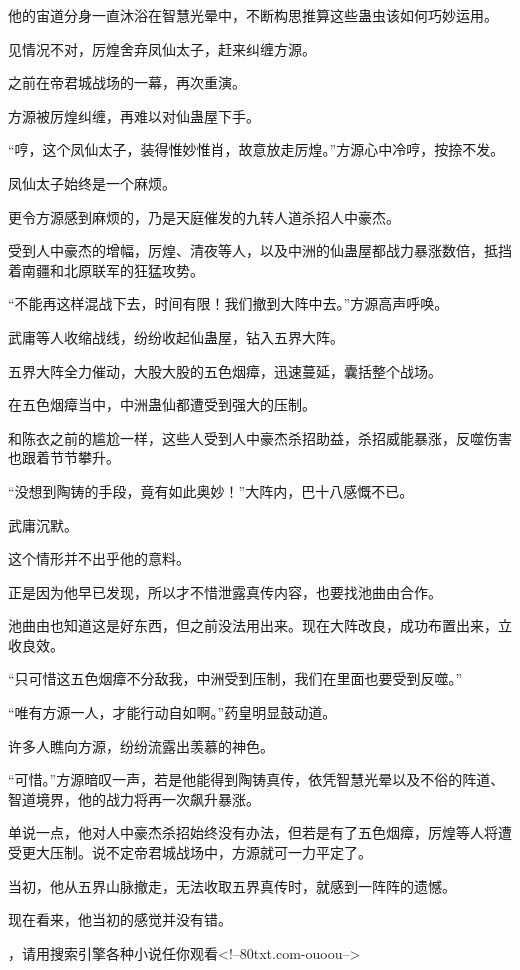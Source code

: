 \begin{this_body}
他的宙道分身一直沐浴在智慧光晕中，不断构思推算这些蛊虫该如何巧妙运用。

见情况不对，厉煌舍弃凤仙太子，赶来纠缠方源。

之前在帝君城战场的一幕，再次重演。

方源被厉煌纠缠，再难以对仙蛊屋下手。

“哼，这个凤仙太子，装得惟妙惟肖，故意放走厉煌。”方源心中冷哼，按捺不发。

凤仙太子始终是一个麻烦。

更令方源感到麻烦的，乃是天庭催发的九转人道杀招人中豪杰。

受到人中豪杰的增幅，厉煌、清夜等人，以及中洲的仙蛊屋都战力暴涨数倍，抵挡着南疆和北原联军的狂猛攻势。

“不能再这样混战下去，时间有限！我们撤到大阵中去。”方源高声呼唤。

武庸等人收缩战线，纷纷收起仙蛊屋，钻入五界大阵。

五界大阵全力催动，大股大股的五色烟瘴，迅速蔓延，囊括整个战场。

在五色烟瘴当中，中洲蛊仙都遭受到强大的压制。

和陈衣之前的尴尬一样，这些人受到人中豪杰杀招助益，杀招威能暴涨，反噬伤害也跟着节节攀升。

“没想到陶铸的手段，竟有如此奥妙！”大阵内，巴十八感慨不已。

武庸沉默。

这个情形并不出乎他的意料。

正是因为他早已发现，所以才不惜泄露真传内容，也要找池曲由合作。

池曲由也知道这是好东西，但之前没法用出来。现在大阵改良，成功布置出来，立收良效。

“只可惜这五色烟瘴不分敌我，中洲受到压制，我们在里面也要受到反噬。”

“唯有方源一人，才能行动自如啊。”药皇明显鼓动道。

许多人瞧向方源，纷纷流露出羡慕的神色。

“可惜。”方源暗叹一声，若是他能得到陶铸真传，依凭智慧光晕以及不俗的阵道、智道境界，他的战力将再一次飙升暴涨。

单说一点，他对人中豪杰杀招始终没有办法，但若是有了五色烟瘴，厉煌等人将遭受更大压制。说不定帝君城战场中，方源就可一力平定了。

当初，他从五界山脉撤走，无法收取五界真传时，就感到一阵阵的遗憾。

现在看来，他当初的感觉并没有错。

，请用搜索引擎各种小说任你观看<!--80txt.com-ouoou-->

\end{this_body}

